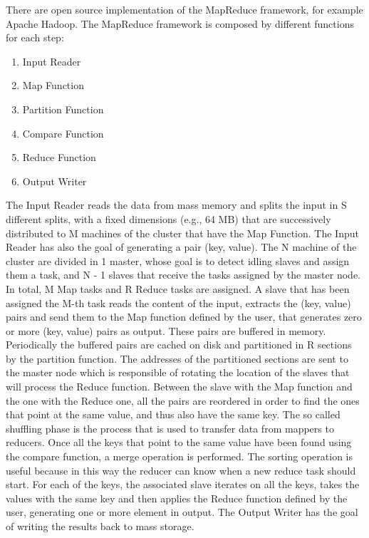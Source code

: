 There are open source implementation of the MapReduce framework, for example Apache Hadoop.
The MapReduce framework is composed by different functions for each step:
\begin{enumerate}
	\item Input Reader
	\item Map Function
	\item Partition Function
	\item Compare Function
	\item Reduce Function
	\item Output Writer
\end{enumerate}

The Input Reader reads the data from mass memory and splits the input in S different splits, with a fixed dimensions (e.g., 64 MB) that are successively distributed to M machines of the cluster that have the Map Function. The Input Reader has also the goal of generating a pair (key, value). The N machine of the cluster are divided in 1 master,
whose goal is to detect idling slaves and assign them a task, and N - 1 slaves that receive the tasks assigned by the master node. In total, M Map tasks and R Reduce tasks are assigned. A slave that has been assigned the M-th task reads the content of the input, extracts the (key, value) pairs and send them to the Map function defined
by the user, that generates zero or more (key, value) pairs as output. These pairs are buffered in memory. Periodically the buffered pairs are cached on disk and partitioned in R sections by the partition function. The addresses of the partitioned sections are sent to the master node which is responsible of rotating the location of the slaves that
will process the Reduce function. Between the slave with the Map function and the one with the Reduce one, all the pairs are reordered in order to find the ones that point at the same value, and thus also have the same key.  
The so called shuffling phase is the process that is used to transfer data from mappers to reducers. Once all the keys that point to the same value have been found using the compare function, a merge operation is performed. The sorting operation is useful because in this way the reducer can know when a new reduce task should start. For each of the keys, the associated slave iterates on all the keys, takes the values with the same key and then applies the Reduce function defined by the user, generating one or more element in output. The Output Writer has the goal of writing the results back to mass storage.
